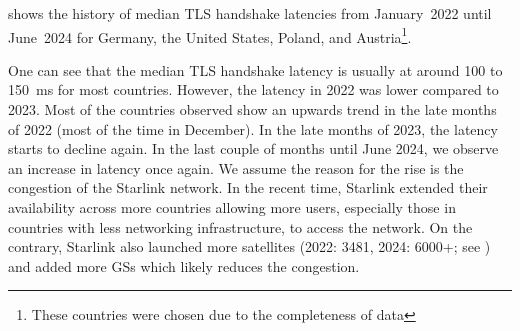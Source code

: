  shows the history of median TLS handshake
latencies from January~2022 until June~2024 for Germany, the United States,
Poland, and Austria\footnote{These countries were chosen due to the
	completeness of data}.

One can see that the median TLS handshake latency is usually at around 100 to
150~ms for most countries. However, the latency in 2022 was lower compared to
2023. Most of the countries observed show an upwards trend in the late months
of 2022 (most of the time in December). In the late months of 2023, the latency
starts to decline again. In the last couple of months until June 2024, we
observe an increase in latency once again. We assume the reason for the rise is
the congestion of the Starlink network. In the recent time, Starlink extended
their availability across more countries allowing more users, especially those
in countries with less networking infrastructure, to access the network. On the
contrary, Starlink also launched more satellites (2022: 3481, 2024: 6000+; see
) and added more \ac{GS}s which likely
reduces the congestion.

